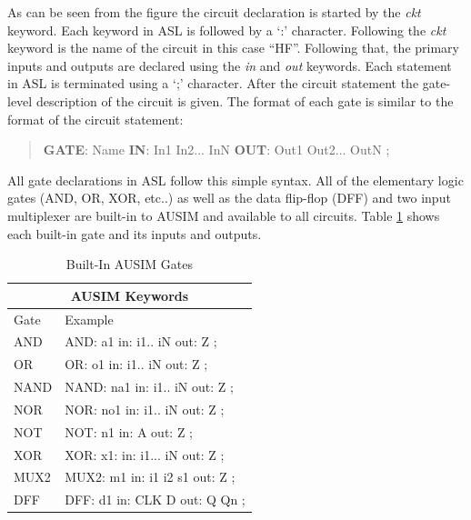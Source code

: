 \documentclass[12pt]{report}
\begin{document}
As can be seen from the figure the circuit declaration is started by the \textit{ckt} keyword\cite{asl}.  Each keyword in ASL is followed by a `:' character\cite{asl}.  Following the \textit{ckt} keyword is the name of the circuit in this case ``HF''.  Following that, the primary inputs and outputs are declared using the \textit{in} and \textit{out} keywords.  Each statement in ASL is terminated using a `;' character\cite{asl}.  After the circuit statement the gate-level description of the circuit is given.  The format of each gate is similar to the format of the circuit statement:
\begin{quote}
	\textbf{GATE}: Name \textbf{IN}: In1 In2... InN \textbf{OUT}: Out1 Out2... OutN ;\cite{asl}
\end{quote}
All gate declarations in ASL follow this simple syntax.  All of the elementary logic gates (AND, OR, XOR, etc..) as well as the data flip-flop (DFF) and two input multiplexer are built-in to AUSIM and available to all circuits\cite{asl}.  Table \ref{tbl:ASLGates} shows each built-in gate and its inputs and outputs.
\begin{table}[bht]
\caption{Built-In AUSIM Gates\cite{asl}}
\begin{center}
\begin{tabular}{|l|l|}
\hline
\multicolumn{2}{|c|}{AUSIM Keywords} \\ \hline
Gate & Example \\ \hline
AND & AND: a1 in: i1.. iN out: Z ; \\ \hline
OR & OR: o1 in: i1.. iN out: Z ; \\ \hline
NAND & NAND: na1 in: i1.. iN out: Z ; \\ \hline
NOR & NOR: no1 in: i1.. iN out: Z ; \\ \hline
NOT & NOT: n1 in: A out: Z ; \\ \hline
XOR & XOR: x1: in: i1... iN out: Z ; \\ \hline
MUX2 & MUX2: m1 in: i1 i2 s1 out: Z ; \\ \hline
DFF & DFF: d1 in: CLK D out: Q Qn ; \\ \hline
\end{tabular}
\end{center}
\label{tbl:ASLGates}
\end{table}
\end{document}
